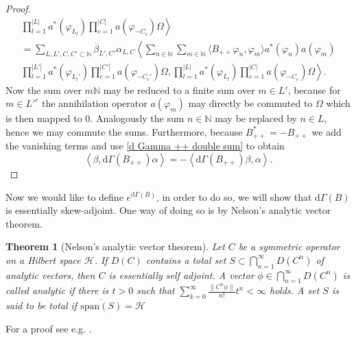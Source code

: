 \documentclass[b5paper,draft,openbib,12pt]{memoir}
\newtheorem{Thm}[Def]{Theorem}
\begin{document}
\begin{proof}
\begin{align}
\left.  \prod_{l=1}^{|L|}a^*(\varphi_{L_l})\prod_{c=1}^{|C|} a(\varphi_{-C_c})\Omega\right\rangle\\\nonumber
= \sum_{L,L',C,C'\subset \mathbb{N}} \overline{\beta}_{L',C'}\alpha_{L,C} 
\left\langle \sum_{n\in\mathbb{N}} \sum_{m\in\mathbb{N}} \langle B_{++}\varphi_n,\varphi_m\rangle a^*(\varphi_n) a(\varphi_{m})\right. \\ \nonumber
\left. \prod_{l=1}^{|L'|}a^*(\varphi_{L_l'})\prod_{c=1}^{|C'|} a(\varphi_{-C_c'})\Omega, \prod_{l=1}^{|L|}a^*(\varphi_{L_l})\prod_{c=1}^{|C|} a(\varphi_{-C_c})\Omega\right\rangle.
\end{align}
Now the sum over \(m\mathbb{N}\) may be reduced to a finite sum over 
\(m\in L'\), because for \(m\in {L'}^c\) the annihilation 
operator \(a(\varphi_m)\) may directly be commuted to \(\Omega\) which 
is then mapped to \(0\). Analogously the sum \(n\in\mathbb{N}\)
may be replaced by \(n\in L\), hence we may commute the sums. 
Furthermore, because \(B_{++}^*=-B_{++}\) we 
add the vanishing terms and use \eqref{d Gamma ++ double sum}
to obtain
\begin{equation}
\left\langle \beta, \mathrm{d}\Gamma(B_{++})\alpha\right\rangle =- \left\langle \mathrm{d}\Gamma(B_{++})\beta, \alpha\right\rangle.
\end{equation}
\end{proof}



Now we would like to define \(e^{\mathrm{d}\Gamma(B)}\), in order to do so, we will show that \(\mathrm{d}\Gamma(B)\) is essentially skew-adjoint. 
One way of doing so is by Nelson's analytic vector theorem. 

\begin{Thm}[Nelson's analytic vector theorem]
Let \(C\) be a symmetric operator on a Hilbert space \(\mathscr{H}\). If \(D(C)\) contains a total set 
\(S\subset \bigcap_{n=1}^\infty D(C^n)\) of analytic vectors, then \(C\) is essentially self adjoint. 
A vector \(\phi\in \bigcap_{n=1}^\infty D(C^n)\) is called analytic if there is \(t>0\) such that
\(\sum_{k=0}^\infty \frac{\|C^n \phi\|}{n!} t^n<\infty\) holds. A set \(S\) is said to be total if \(\overline{\text{span}(S)}=\mathscr{H}\)
\end{Thm}
For a proof see e.g. \cite{SimonReed2}.
\end{document}
